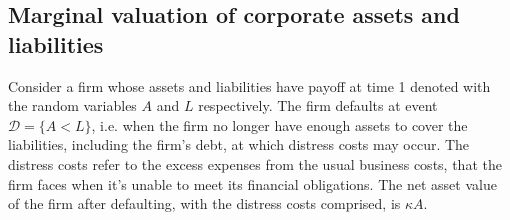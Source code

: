 \documentclass[../main.tex]{subfiles}
\begin{document}
    \subsection{Marginal valuation of corporate assets and liabilities}
        Consider a firm whose assets and liabilities have payoff at time 1 denoted with the random variables $A$ and $L$ respectively.
        The firm defaults at event $\mathcal{D}=\{A<L\}$, i.e. when the firm no longer have enough assets to cover the liabilities, including the firm's debt, at which distress costs may occur.
        The distress costs refer to the excess expenses from the usual business costs, that the firm faces when it's unable to meet its financial obligations.
        The net asset value of the firm after defaulting, with the distress costs comprised, is $\kappa A$.
        
\end{document}
